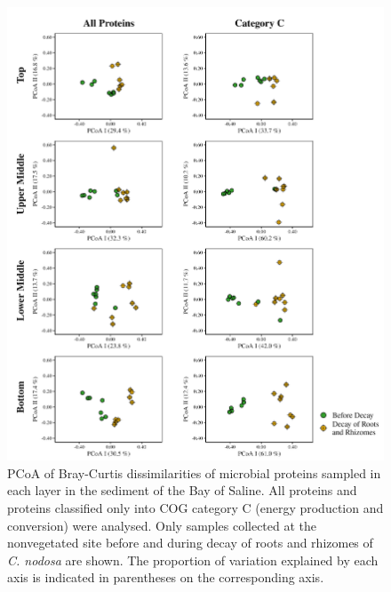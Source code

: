 \documentclass[
  12 pt,
]{article}
\begin{document}
\begin{figure}[H]

{\centering \includegraphics[width=0.95\linewidth]{../results/figures/pcoa_layer} 

}

\caption{PCoA of Bray-Curtis dissimilarities of microbial proteins sampled in each layer in the sediment of the Bay of Saline. All proteins and proteins classified only into COG category C (energy production and conversion) were analysed. Only samples collected at the nonvegetated site before and during decay of roots and rhizomes of \emph{C. nodosa} are shown. The proportion of variation explained by each axis is indicated in parentheses on the corresponding axis.}\label{fig:pcoa-layer}
\end{figure}
\end{document}

